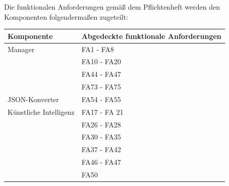 Die funktionalen Anforderungen gemäß dem Pflichtenheft werden den Komponenten folgendermaßen zugeteilt:

\begin{tabular}{|l|l|}
	\hline
	\textbf{Komponente} & \textbf{Abgedeckte funktionale Anforderungen}\\\hline
	Manager & FA1 - FA8\\
	& FA10 - FA20\\
	& FA44 - FA47\\
	& FA73 - FA75\\\hline
	JSON-Konverter & FA54 - FA55\\\hline
	Künstliche Intelligenz & FA17 - FA 21\\
	& FA26 - FA28\\
	& FA30 - FA35\\
	& FA37 - FA42\\
	&FA46 - FA47\\
	&FA50\\\hline
	
\end{tabular}
